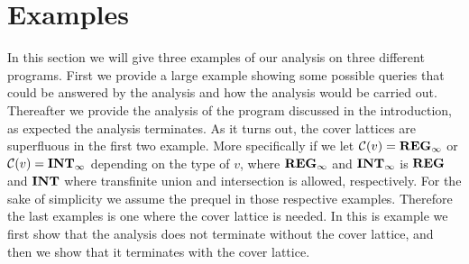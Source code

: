 \section{Examples}\label{sec:example}
In this section we will give three examples of our analysis on three different programs.
First we provide a large example showing some possible queries that could be answered by the analysis and how the analysis would be carried out.
Thereafter we provide the analysis of the program discussed in the introduction, as expected the analysis terminates.
As it turns out, the cover lattices are superfluous in the first two example.
More specifically if we let $\mathcal{C}(v) = \mathbf{REG}_{\infty}$ or $\mathcal{C}(v) = \mathbf{INT}_{\infty}$ depending on the type of $v$, where $\mathbf{REG}_{\infty}$ and $\mathbf{INT}_{\infty}$ is $\mathbf{REG}$ and $\mathbf{INT}$ where transfinite union and intersection is allowed, respectively.
For the sake of simplicity we assume the prequel in those respective examples.
Therefore the last examples is one where the cover lattice is needed.
In this is example we first show that the analysis does not terminate without the cover lattice, and then we show that it terminates with the cover lattice.





